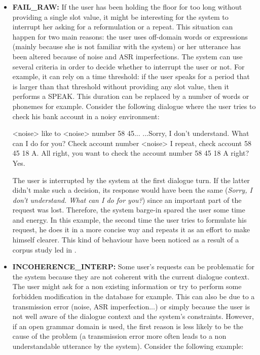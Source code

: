      \begin{itemize}

     \item \textbf{FAIL\_RAW:} If the user has been holding the floor for too long without providing a single slot value, it might be interesting for the system to interrupt her asking for a reformulation or a repeat. This situation can happen for two main reasons: the user uses off-domain words or expressions (mainly because she is not familiar with the system) or her utterance has been altered because of noise and ASR imperfections. The system can use several criteria in order to decide whether to interrupt the user or not. For example, it can rely on a time threshold: if the user speaks for a period that is larger than that threshold without providing any slot value, then it performs a SPEAK. This duration can be replaced by a number of words or phonemes for example. Consider the following dialogue where the user tries to check his bank account in a noisy environment:

          \begin{dialogue}
             <noise> like to <noise> number 58 45...
             ...Sorry, I don't understand. What can I do for you?
             Check account number <noise> I repeat, check account 58 45 18 A.
             All right, you want to check the account number 58 45 18 A right?
             Yes.
          \end{dialogue}

          The user is interrupted by the system at the first dialogue turn. If the latter didn't make such a decision, its response would have been the same (\textit{Sorry, I don't understand. What can I do for you?}) since an important part of the request was lost. Therefore, the system barge-in spared the user some time and energy. In this example, the second time the user tries to formulate his request, he does it in a more concise way and repeats it as an effort to make himself clearer. This kind of behaviour have been noticed as a result of a corpus study led in \cite{Ghigi2014}.

     \item \textbf{INCOHERENCE\_INTERP:} Some user's requests can be problematic for the system because they are not coherent with the current dialogue context. The user might ask for a non existing information or try to perform some forbidden modification in the database for example. This can also be due to a transmission error (noise, ASR imperfection...) or simply because the user is not well aware of the dialogue context and the system's constraints. However, if an open grammar domain is used, the first reason is less likely to be the cause of the problem (a transmission error more often leads to a non understandable utterance by the system). Consider the following example:
		

\end{itemize}
